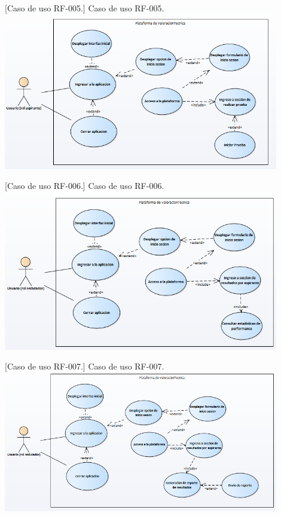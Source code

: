     \vspace{2mm}
    \begin{minipage}{0.9\textwidth}
    \centering
    [{Caso de uso RF-005.}]{ Caso de uso RF-005. }
    \label{caso1}
     \includegraphics[width=0.9\textwidth]{Images/casoUso5.png}
    \end{minipage}
    
    \vspace{2mm}
    \begin{minipage}{0.9\textwidth}
    \centering
    [{Caso de uso RF-006.}]{ Caso de uso RF-006. }
    \label{caso1}
     \includegraphics[width=0.9\textwidth]{Images/casoUso6.png}
    \end{minipage}
    
    \vspace{2mm}
    \begin{minipage}{0.9\textwidth}
    \centering
    [{Caso de uso RF-007.}]{ Caso de uso RF-007. }
    \label{caso1}
     \includegraphics[width=0.9\textwidth]{Images/casoUso7.png}
    \end{minipage}
    
